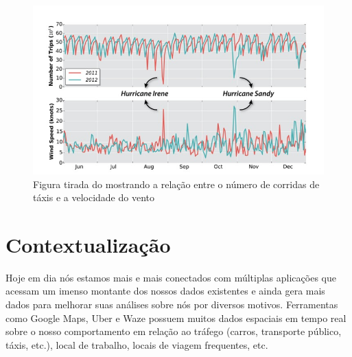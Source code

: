 \begin{figure}[t]
	\centering
	\includegraphics[width=\textwidth]{images/outlier-freire-figure-1}
	\caption{Figura tirada do \cite{DBLP:journals/debu/FreireCVZ16} mostrando a relação entre o número de corridas de táxis e a velocidade do vento}
	\label{fig:freire-paper-taxi-wind}
	\vspace{-10pt}
\end{figure}

\section{Contextualização}


Hoje em dia nós estamos mais e mais conectados com múltiplas aplicações que acessam um imenso montante dos nossos dados existentes e ainda gera mais dados para melhorar suas análises sobre nós por diversos motivos. Ferramentas como Google Maps, Uber e Waze possuem muitos dados espaciais em tempo real sobre o nosso comportamento em relação ao tráfego (carros, transporte público, táxis, etc.), local de trabalho, locais de viagem frequentes, etc.


